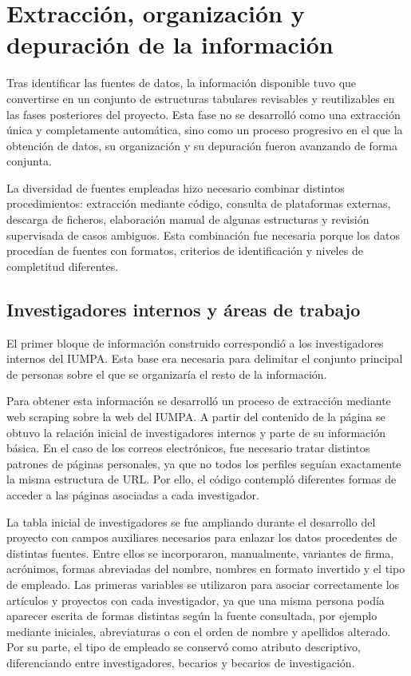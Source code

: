 \documentclass[11pt,spanish,listoffigures,listoftables]{tfgetsinf}
\begin{document}
\section{Extracción, organización y depuración de la información}

Tras identificar las fuentes de datos, la información disponible tuvo que convertirse en un conjunto de estructuras tabulares revisables y reutilizables en las fases posteriores del proyecto. Esta fase no se desarrolló como una extracción única y completamente automática, sino como un proceso progresivo en el que la obtención de datos, su organización y su depuración fueron avanzando de forma conjunta.

La diversidad de fuentes empleadas hizo necesario combinar distintos procedimientos: extracción mediante código, consulta de plataformas externas, descarga de ficheros, elaboración manual de algunas estructuras y revisión supervisada de casos ambiguos. Esta combinación fue necesaria porque los datos procedían de fuentes con formatos, criterios de identificación y niveles de completitud diferentes.

\subsection{Investigadores internos y áreas de trabajo}

El primer bloque de información construido correspondió a los investigadores internos del IUMPA. Esta base era necesaria para delimitar el conjunto principal de personas sobre el que se organizaría el resto de la información.

Para obtener esta información se desarrolló un proceso de extracción mediante web scraping sobre la web del IUMPA. A partir del contenido de la página se obtuvo la relación inicial de investigadores internos y parte de su información básica. En el caso de los correos electrónicos, fue necesario tratar distintos patrones de páginas personales, ya que no todos los perfiles seguían exactamente la misma estructura de URL. Por ello, el código contempló diferentes formas de acceder a las páginas asociadas a cada investigador.

La tabla inicial de investigadores se fue ampliando durante el desarrollo del proyecto con campos auxiliares necesarios para enlazar los datos procedentes de distintas fuentes. Entre ellos se incorporaron, manualmente, variantes de firma, acrónimos, formas abreviadas del nombre, nombres en formato invertido y el tipo de empleado. Las primeras variables se utilizaron para asociar correctamente los artículos y proyectos con cada investigador, ya que una misma persona podía aparecer escrita de formas distintas según la fuente consultada, por ejemplo mediante iniciales, abreviaturas o con el orden de nombre y apellidos alterado. Por su parte, el tipo de empleado se conservó como atributo descriptivo, diferenciando entre investigadores, becarios y becarios de investigación.
\end{document}
